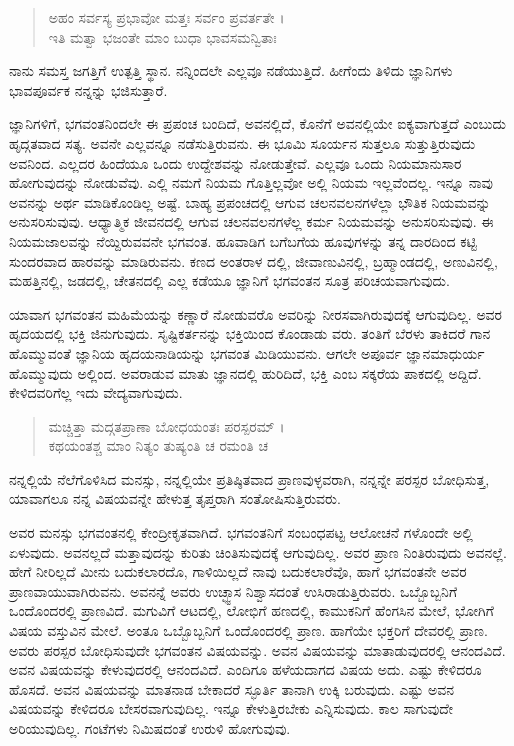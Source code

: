 \begin{verse}
ಅಹಂ ಸರ್ವಸ್ಯ ಪ್ರಭಾವೋ ಮತ್ತಃ ಸರ್ವಂ ಪ್ರವರ್ತತೇ ।\\ಇತಿ ಮತ್ವಾ ಭಜಂತೇ ಮಾಂ ಬುಧಾ ಭಾವಸಮನ್ವಿತಾಃ 
\end{verse}

{\small ನಾನು ಸಮಸ್ತ ಜಗತ್ತಿಗೆ ಉತ್ಪತ್ತಿ ಸ್ಥಾನ. ನನ್ನಿಂದಲೇ ಎಲ್ಲವೂ ನಡೆಯುತ್ತಿದೆ. ಹೀಗೆಂದು ತಿಳಿದು ಜ್ಞಾನಿಗಳು ಭಾವಪೂರ್ವಕ ನನ್ನನ್ನು ಭಜಿಸುತ್ತಾರೆ.}

ಜ್ಞಾನಿಗಳಿಗೆ, ಭಗವಂತನಿಂದಲೇ ಈ ಪ್ರಪಂಚ ಬಂದಿದೆ, ಅವನಲ್ಲಿದೆ, ಕೊನೆಗೆ ಅವನಲ್ಲಿಯೇ ಐಕ್ಯವಾಗುತ್ತದೆ ಎಂಬುದು ಹೃದ್ಗತವಾದ ಸತ್ಯ. ಅವನೇ ಎಲ್ಲವನ್ನೂ ನಡೆಸುತ್ತಿರುವನು. ಈ ಭೂಮಿ ಸೂರ್ಯನ ಸುತ್ತಲೂ ಸುತ್ತುತ್ತಿರುವುದು ಅವನಿಂದ. ಎಲ್ಲದರ ಹಿಂದೆಯೂ ಒಂದು ಉದ್ದೇಶವನ್ನು ನೋಡುತ್ತೇವೆ. ಎಲ್ಲವೂ ಒಂದು ನಿಯಮಾನುಸಾರ ಹೋಗುವುದನ್ನು ನೋಡುವೆವು. ಎಲ್ಲಿ ನಮಗೆ ನಿಯಮ ಗೊತ್ತಿಲ್ಲವೋ ಅಲ್ಲಿ ನಿಯಮ ಇಲ್ಲವೆಂದಲ್ಲ. ಇನ್ನೂ ನಾವು ಅವನನ್ನು ಅರ್ಥ ಮಾಡಿಕೊಂಡಿಲ್ಲ ಅಷ್ಟೆ. ಬಾಹ್ಯ ಪ್ರಪಂಚದಲ್ಲಿ ಆಗುವ ಚಲನವಲನಗಳೆಲ್ಲಾ ಭೌತಿಕ ನಿಯಮವನ್ನು ಅನುಸರಿಸುವುವು. ಆಧ್ಯಾತ್ಮಿಕ ಜೀವನದಲ್ಲಿ ಆಗುವ ಚಲನವಲನಗಳೆಲ್ಲ ಕರ್ಮ ನಿಯಮವನ್ನು ಅನುಸರಿಸುವುವು. ಈ ನಿಯಮಜಾಲವನ್ನು ನೆಯ್ದಿರುವವನೇ ಭಗವಂತ. ಹೂವಾಡಿಗ ಬಗೆಬಗೆಯ ಹೂವುಗಳನ್ನು ತನ್ನ ದಾರದಿಂದ ಕಟ್ಟಿ ಸುಂದರವಾದ ಹಾರವನ್ನು ಮಾಡಿರುವನು. ಕಣದ ಅಂತರಾಳ ದಲ್ಲಿ, ಜೀವಾಣುವಿನಲ್ಲಿ, ಬ್ರಹ್ಮಾಂಡದಲ್ಲಿ, ಅಣುವಿನಲ್ಲಿ, ಮಹತ್ತಿನಲ್ಲಿ, ಜಡದಲ್ಲಿ, ಚೇತನದಲ್ಲಿ ಎಲ್ಲ ಕಡೆಯೂ ಜ್ಞಾನಿಗೆ ಭಗವಂತನ ಸೂತ್ರ ಪರಿಚಯವಾಗುವುದು.

ಯಾವಾಗ ಭಗವಂತನ ಮಹಿಮೆಯನ್ನು ಕಣ್ಣಾರೆ ನೋಡುವರೊ ಅವರಿನ್ನು ನೀರಸವಾಗಿರುವುದಕ್ಕೆ ಆಗುವುದಿಲ್ಲ. ಅವರ ಹೃದಯದಲ್ಲಿ ಭಕ್ತಿ ಜಿನುಗುವುದು. ಸೃಷ್ಟಿಕರ್ತನನ್ನು ಭಕ್ತಿಯಿಂದ ಕೊಂಡಾಡು ವರು. ತಂತಿಗೆ ಬೆರಳು ತಾಕಿದರೆ ಗಾನ ಹೊಮ್ಮುವಂತೆ ಜ್ಞಾನಿಯ ಹೃದಯನಾಡಿಯನ್ನು ಭಗವಂತ ಮಿಡಿಯುವನು. ಆಗಲೇ ಅಪೂರ್ವ ಜ್ಞಾನಮಾಧುರ್ಯ ಹೊಮ್ಮುವುದು ಅಲ್ಲಿಂದ. ಅವರಾಡುವ ಮಾತು ಜ್ಞಾನದಲ್ಲಿ ಹುರಿದಿದೆ, ಭಕ್ತಿ ಎಂಬ ಸಕ್ಕರೆಯ ಪಾಕದಲ್ಲಿ ಅದ್ದಿದೆ. ಕೇಳಿದವರಿಗೆಲ್ಲ ಇದು ವೇದ್ಯವಾಗುವುದು.

\begin{verse}
ಮಚ್ಚಿತ್ತಾ ಮದ್ಗತಪ್ರಾಣಾ ಬೋಧಯಂತಃ ಪರಸ್ಪರಮ್​ ।\\ಕಥಯಂತಶ್ಚ ಮಾಂ ನಿತ್ಯಂ ತುಷ್ಯಂತಿ ಚ ರಮಂತಿ ಚ 
\end{verse}

{\small ನನ್ನಲ್ಲಿಯೆ ನೆಲೆಗೊಳಿಸಿದ ಮನಸ್ಸು, ನನ್ನಲ್ಲಿಯೇ ಪ್ರತಿಷ್ಠಿತವಾದ ಪ್ರಾಣವುಳ್ಳವರಾಗಿ, ನನ್ನನ್ನೇ ಪರಸ್ಪರ ಬೋಧಿಸುತ್ತ, ಯಾವಾಗಲೂ ನನ್ನ ವಿಷಯವನ್ನೇ ಹೇಳುತ್ತ ತೃಪ್ತರಾಗಿ ಸಂತೋಷಿಸುತ್ತಿರುವರು.}

ಅವರ ಮನಸ್ಸು ಭಗವಂತನಲ್ಲಿ ಕೇಂದ್ರೀಕೃತವಾಗಿದೆ. ಭಗವಂತನಿಗೆ ಸಂಬಂಧಪಟ್ಟ ಆಲೋಚನೆ ಗಳೊಂದೇ ಅಲ್ಲಿ ಏಳುವುದು. ಅವನಲ್ಲದೆ ಮತ್ತಾವುದನ್ನು ಕುರಿತು ಚಿಂತಿಸುವುದಕ್ಕೆ ಆಗುವುದಿಲ್ಲ. ಅವರ ಪ್ರಾಣ ನಿಂತಿರುವುದು ಅವನಲ್ಲೆ. ಹೇಗೆ ನೀರಿಲ್ಲದೆ ಮೀನು ಬದುಕಲಾರದೊ, ಗಾಳಿಯಿಲ್ಲದೆ ನಾವು ಬದುಕಲಾರೆವೊ, ಹಾಗೆ ಭಗವಂತನೇ ಅವರ ಪ್ರಾಣವಾಯುವಾಗಿರುವನು. ಅವನನ್ನೆ ಅವರು ಉಚ್ಛ್ವಾಸ ನಿಶ್ವಾಸದಂತೆ ಉಸಿರಾಡುತ್ತಿರುವರು. ಒಬ್ಬೊಬ್ಬನಿಗೆ ಒಂದೊಂದರಲ್ಲಿ ಪ್ರಾಣವಿದೆ. ಮಗುವಿಗೆ ಆಟದಲ್ಲಿ, ಲೋಭಿಗೆ ಹಣದಲ್ಲಿ, ಕಾಮುಕನಿಗೆ ಹೆಂಗಸಿನ ಮೇಲೆ, ಭೋಗಿಗೆ ವಿಷಯ ವಸ್ತುವಿನ ಮೇಲೆ. ಅಂತೂ ಒಬ್ಬೊಬ್ಬನಿಗೆ ಒಂದೊಂದರಲ್ಲಿ ಪ್ರಾಣ. ಹಾಗೆಯೇ ಭಕ್ತರಿಗೆ ದೇವರಲ್ಲಿ ಪ್ರಾಣ. ಅವರು ಪರಸ್ಪರ ಬೋಧಿಸುವುದೇ ಭಗವಂತನ ವಿಷಯವನ್ನು. ಅವನ ವಿಷಯವನ್ನು ಮಾತಾಡುವುದರಲ್ಲಿ ಆನಂದವಿದೆ. ಅವನ ವಿಷಯವನ್ನು ಕೇಳುವುದರಲ್ಲಿ ಆನಂದವಿದೆ. ಎಂದಿಗೂ ಹಳೆಯದಾಗದ ವಿಷಯ ಅದು. ಎಷ್ಟು ಕೇಳಿದರೂ ಹೊಸದೆ. ಅವನ ವಿಷಯವನ್ನು ಮಾತನಾಡ ಬೇಕಾದರೆ ಸ್ಫೂರ್ತಿ ತಾನಾಗಿ ಉಕ್ಕಿ ಬರುವುದು. ಎಷ್ಟು ಅವನ ವಿಷಯವನ್ನು ಕೇಳಿದರೂ ಬೇಸರವಾಗುವುದಿಲ್ಲ. ಇನ್ನೂ ಕೇಳುತ್ತಿರಬೇಕು ಎನ್ನಿಸುವುದು. ಕಾಲ ಸಾಗುವುದೇ ಅರಿಯುವುದಿಲ್ಲ. ಗಂಟೆಗಳು ನಿಮಿಷದಂತೆ ಉರುಳಿ ಹೋಗುವುವು.

